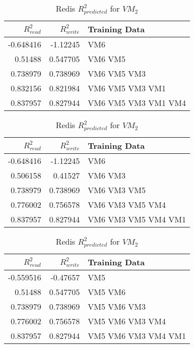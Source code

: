 \begin{table}
\centering
\caption{Redis $R_{predicted}^2$ for $VM_2$}
\begin{tabular}{|r|r|l|} \hline
$R_{read}^2$&$R_{write}^2$&Training Data\\ \hline
-0.648416 & -1.12245 & VM6 \\ \hline 
0.51488 & 0.547705 & VM6 VM5 \\ \hline 
0.738979 & 0.738969 & VM6 VM5 VM3 \\ \hline 
0.832156 & 0.821984 & VM6 VM5 VM3 VM1 \\ \hline 
0.837957 & 0.827944 & VM6 VM5 VM3 VM1 VM4 \\ \hline 
\hline\end{tabular}
\label{table:redis}

\centering
\caption{Redis $R_{predicted}^2$ for $VM_2$}
\begin{tabular}{|r|r|l|} \hline
$R_{read}^2$&$R_{write}^2$&Training Data\\ \hline
-0.648416 & -1.12245 & VM6 \\ \hline 
0.506158 & 0.41527 & VM6 VM3 \\ \hline 
0.738979 & 0.738969 & VM6 VM3 VM5 \\ \hline 
0.776002 & 0.756578 & VM6 VM3 VM5 VM4 \\ \hline 
0.837957 & 0.827944 & VM6 VM3 VM5 VM4 VM1 \\ \hline 
\hline\end{tabular}
\label{table:redis}

\centering
\caption{Redis $R_{predicted}^2$ for $VM_2$}
\begin{tabular}{|r|r|l|} \hline
$R_{read}^2$&$R_{write}^2$&Training Data\\ \hline
-0.559516 & -0.47657 & VM5 \\ \hline 
0.51488 & 0.547705 & VM5 VM6 \\ \hline 
0.738979 & 0.738969 & VM5 VM6 VM3 \\ \hline 
0.776002 & 0.756578 & VM5 VM6 VM3 VM4 \\ \hline 
0.837957 & 0.827944 & VM5 VM6 VM3 VM4 VM1 \\ \hline 
\hline\end{tabular}
\label{table:redis}


\end{table}
